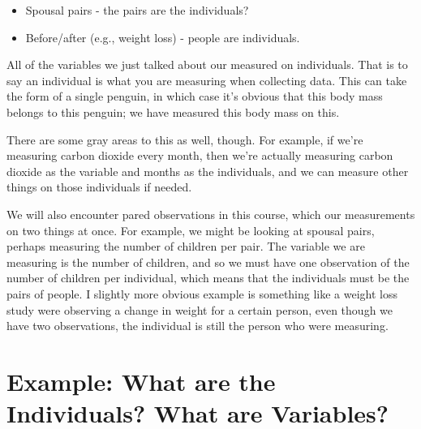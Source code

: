 \documentclass[
  letterpaper,
  DIV=11,
  numbers=noendperiod]{scrreprt}
\providecommand{\tightlist}{%
  \setlength{\itemsep}{0pt}\setlength{\parskip}{0pt}}\usepackage{longtable,booktabs,array}
\begin{document}
\begin{tcolorbox}[enhanced jigsaw, opacitybacktitle=0.6, left=2mm, colbacktitle=quarto-callout-warning-color!10!white, colframe=quarto-callout-warning-color-frame, breakable, toptitle=1mm, title=\textcolor{quarto-callout-warning-color}{\faExclamationTriangle}\hspace{0.5em}{Paired Observations}, opacityback=0, bottomrule=.15mm, toprule=.15mm, arc=.35mm, leftrule=.75mm, titlerule=0mm, bottomtitle=1mm, colback=white, rightrule=.15mm, coltitle=black]

\begin{itemize}
\tightlist
\item
  Spousal pairs - the pairs are the individuals?
\item
  Before/after (e.g., weight loss) - people are individuals.
\end{itemize}

\end{tcolorbox}

All of the variables we just talked about our measured on individuals.
That is to say an individual is what you are measuring when collecting
data. This can take the form of a single penguin, in which case it's
obvious that this body mass belongs to this penguin; we have measured
this body mass on this.

There are some gray areas to this as well, though. For example, if we're
measuring carbon dioxide every month, then we're actually measuring
carbon dioxide as the variable and months as the individuals, and we can
measure other things on those individuals if needed.

We will also encounter pared observations in this course, which our
measurements on two things at once. For example, we might be looking at
spousal pairs, perhaps measuring the number of children per pair. The
variable we are measuring is the number of children, and so we must have
one observation of the number of children per individual, which means
that the individuals must be the pairs of people. I slightly more
obvious example is something like a weight loss study were observing a
change in weight for a certain person, even though we have two
observations, the individual is still the person who were measuring.

\hypertarget{example-what-are-the-individuals-what-are-variables}{%
\section{Example: What are the Individuals? What are
Variables?}\label{example-what-are-the-individuals-what-are-variables}}
\end{document}
